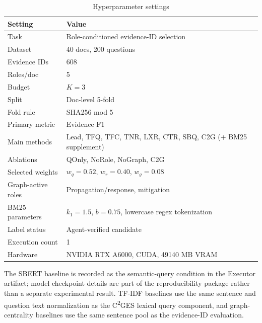 \documentclass[11pt,letterpaper]{article}
\newcommand{\cges}{C\textsuperscript{2}GES}
\begin{document}
\begin{table}[ht]
\centering
\caption{Hyperparameter settings}
\label{tab:s2}
\begin{tabular}{ll}
\toprule
\textbf{Setting} & \textbf{Value} \\
\midrule
Task & Role-conditioned evidence-ID selection \\
Dataset & 40 docs, 200 questions \\
Evidence IDs & 608 \\
Roles/doc & 5 \\
Budget & $K=3$ \\
Split & Doc-level 5-fold \\
Fold rule & SHA256 mod 5 \\
Primary metric & Evidence F1 \\
Main methods & Lead, TFQ, TFC, TNR, LXR, CTR, SBQ, C2G (+ BM25 supplement) \\
Ablations & QOnly, NoRole, NoGraph, C2G \\
Selected weights & $w_q=0.52$, $w_r=0.40$, $w_g=0.08$ \\
Graph-active roles & Propagation/response, mitigation \\
BM25 parameters & $k_1=1.5$, $b=0.75$, lowercase regex tokenization \\
Label status & Agent-verified candidate \\
Execution count & 1 \\
Hardware & NVIDIA RTX A6000, CUDA, 49140 MB VRAM \\
\bottomrule
\end{tabular}
\end{table}

The SBERT baseline is recorded as the semantic-query condition in the Executor artifact; model checkpoint details are part of the reproducibility package rather than a separate experimental result. TF-IDF baselines use the same sentence and question text normalization as the \cges{} lexical query component, and graph-centrality baselines use the same sentence pool as the evidence-ID evaluation.
\end{document}
